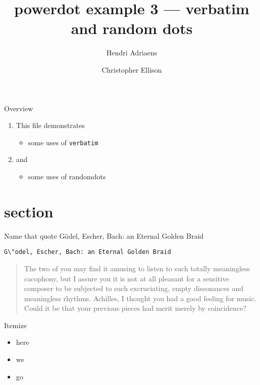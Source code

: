 \documentclass[style=klope,clock,hlsections]{powerdot}
\title{powerdot example 3 --- verbatim and random dots}
\author{Hendri Adriaens\and Christopher Ellison}
\begin{document}
\maketitle

\begin{slide}{Overview}
  \begin{enumerate}[type=1]
    \item This file demonstrates \pause
    \begin{itemize}
      \item some uses of \texttt{verbatim} \pause
    \end{itemize}
    \item and \pause
    \begin{itemize}
      \item some uses of randomdots
    \end{itemize}
  \end{enumerate}
\end{slide}

\section{section}

\begin{slide}[palette=PastelFlower,method=direct,
              dprop={dotstyle=*},
              dminsize=5pt,dmaxsize=10pt,
              dmindots=5,dmaxdots=10]{Name that quote}
  G\"odel, Escher, Bach: an Eternal Golden Braid \pause

  \verb|G\"odel, Escher, Bach: an Eternal Golden Braid| \pause

  \begin{quote}
    The two of you may find it amusing to listen
    to such totally meaningless cacophony, but I assure you it is not at
    all pleasant for a sensitive composer to be subjected to such
    excruciating, empty dissonances and meaningless rhythms.  Achilles,
    I thought you had a good feeling for music. Could it be that your
    previous pieces had merit merely by coincidence?
  \end{quote}
\end{slide}

\begin{slide}[palette=BlueWater,
              dprop={dotstyle=osquare,linewidth=.2pt},
              dminsize=4pt,dmaxsize=10pt,
              dmindots=5,dmaxdots=10]{Itemize}
  \begin{itemize}
    \item<1> here
    \item<2> we
    \item<3> go
  \end{itemize}
\end{slide}
\end{document}
